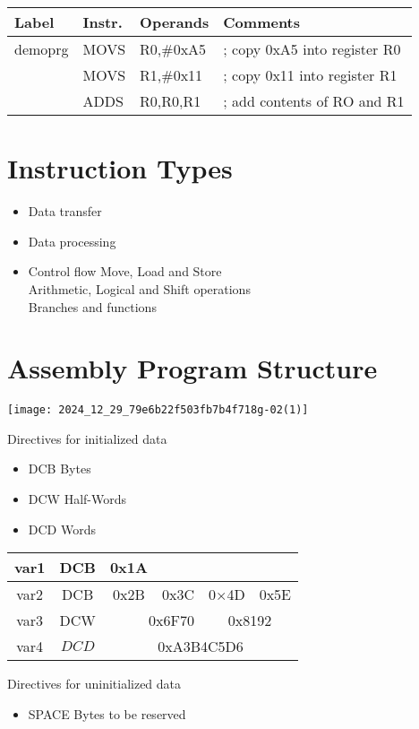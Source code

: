 \begin{center}
\begin{tabular}{llll}
Label & Instr. & Operands & Comments \\
\hline
demoprg & MOVS & R0,\#0xA5 & ; copy 0xA5 into register R0 \\
 & MOVS & R1,\#0x11 & ; copy 0x11 into register R1 \\
 & ADDS & R0,R0,R1 & ; add contents of RO and R1 \\
\end{tabular}
\end{center}

\section*{Instruction Types}
\begin{itemize}
  \item Data transfer
  \item Data processing
  \item Control flow Move, Load and Store\\
Arithmetic, Logical and Shift operations\\
Branches and functions
\end{itemize}

\section*{Assembly Program Structure}
\begin{center}
\texttt{[image: 2024\_12\_29\_79e6b22f503fb7b4f718g-02(1)]}
\end{center}

Directives for initialized data

\begin{itemize}
  \item DCB Bytes
  \item DCW Half-Words
  \item DCD Words
\end{itemize}

\begin{center}
\begin{tabular}{|c|c|c|c|c|c|}
\hline
var1 & DCB & 0x1A &  &  &  \\
\hline
var2 & DCB & 0x2B & 0x3C & 0×4D & 0x5E \\
\hline
var3 & DCW & \multicolumn{2}{|r|}{0x6F70} & \multicolumn{2}{|c|}{0x8192} \\
\hline
var4 & $D C D$ & \multicolumn{4}{|c|}{0xA3B4C5D6} \\
\hline
\end{tabular}
\end{center}

Directives for uninitialized data

\begin{itemize}
  \item SPACE Bytes to be reserved
\end{itemize}